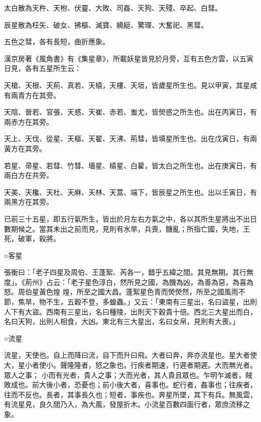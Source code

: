 \begin{pinyinscope}
 太白散為天杵、天柎、伏靈、大敗、司姦、天狗、天殘、卒起、白彗。



 辰星散為枉矢、破女、拂樞、滅寶、繞綎、驚理、大奮祀、黑彗。



 五色之彗，各有長短，曲折應象。



 漢京房著《風角書》有《集星章》，所載妖星皆見於月旁，互有五色方雲，以五寅日見，各有五星所生云：



 天槍、天根、天荊、真若、天榬，天樓、天垣，皆歲星所生也。見以甲寅，其星咸有兩青方在其旁。



 天陰、晉若、官張、天惑、天崔、赤若、蚩尤，皆熒惑之所生也。出在丙寅日，有兩赤方在其旁。



 天上、天伐、從星、天樞、天翟、天沸、荊彗，皆填星所生也。出在戊寅日，有兩黃方在其旁。



 若星、帚星、若彗、竹彗、墻星、榬星、白雚，皆太白之所生也。出在庚寅日，有兩白方在共旁。



 天美、天欃、天杜、天麻、天林、天蒿、端下，皆辰星之所生也。出以壬寅日，有兩黑方在其旁。



 已前三十五星，即五行氣所生，皆出於月左右方氣之中，各以其所生星將出不出日數期候之。當其未出之前而見，見則有水旱，兵喪，饑亂；所指亡國，失地，王死，破軍，殺將。



 ○客星



 張衡曰：「老子四星及周伯、王蓬絮、芮各一，錯乎五緯之間。其見無期。其行無度」。《荊州》占云：「老子星色淳白，然所見之國，為饑為凶，為善為惡，為喜為怒。周伯星黃色煌
 煌，所至之國大昌。蓬絮星色青而熒熒然，所至之國風雨不節，焦旱，物不生，五穀不登，多蝗蟲。」又云：「東南有三星出，名曰盜星，出則人下有大盜。西南有三星出，名曰種陵，出則天下穀貴十倍。西北三大星出而白，名曰天狗，出則人相食，大凶。東北有三大星出，名曰女帛，見則有大喪。」



 ○流星



 流星，天使也。自上而降曰流，自下而升曰飛。大者曰奔，奔亦流星也。星大者使大，星小者使小。聲隆隆者，怒之象也。行疾者期速，行遲者期遲。大而無光者。眾人之事；
 小而有光者，貴人之事；大而光者，其人貴且眾也。乍明乍滅者，賊敗成也。前大後小者，恐憂也；前小後大者，喜事也。蛇行者，姦事也；往疾者，往而不反也。長者，其事長久也；短者，事疾也。奔星所墜，其下有兵。無風雲，有流星見，良久間乃入，為大風，發屋折木。小流星百數四面行者，眾庶流移之象。




\end{pinyinscope}
